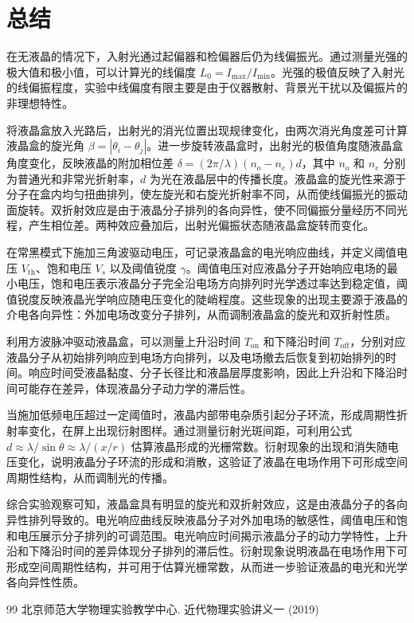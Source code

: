 \documentclass[a4paper, 1.5lines]{ctexart}
\begin{document}
    \section{总结}
        在无液晶的情况下，入射光通过起偏器和检偏器后仍为线偏振光。通过测量光强的极大值和极小值，可以计算光的线偏度 $L_0 = I_{\text{max}}/I_{\text{min}}$。光强的极值反映了入射光的线偏振程度，实验中线偏度有限主要是由于仪器散射、背景光干扰以及偏振片的非理想特性。

将液晶盒放入光路后，出射光的消光位置出现规律变化，由两次消光角度差可计算液晶盒的旋光角 $\beta = |\theta_i - \theta_j|$。进一步旋转液晶盒时，出射光的极值角度随液晶盒角度变化，反映液晶的附加相位差 $\delta = (2\pi/\lambda)(n_o - n_e)d$，其中 $n_o$ 和 $n_e$ 分别为普通光和非常光折射率，$d$ 为光在液晶层中的传播长度。液晶盒的旋光性来源于分子在盒内均匀扭曲排列，使左旋光和右旋光折射率不同，从而使线偏振光的振动面旋转。双折射效应是由于液晶分子排列的各向异性，使不同偏振分量经历不同光程，产生相位差。两种效应叠加后，出射光偏振状态随液晶盒旋转而变化。

在常黑模式下施加三角波驱动电压，可记录液晶盒的电光响应曲线，并定义阈值电压 $V_{\text{th}}$、饱和电压 $V_s$ 以及阈值锐度 $\gamma$。阈值电压对应液晶分子开始响应电场的最小电压，饱和电压表示液晶分子完全沿电场方向排列时光学透过率达到稳定值，阈值锐度反映液晶光学响应随电压变化的陡峭程度。这些现象的出现主要源于液晶的介电各向异性：外加电场改变分子排列，从而调制液晶盒的旋光和双折射性质。

利用方波脉冲驱动液晶盒，可以测量上升沿时间 $T_{\text{on}}$ 和下降沿时间 $T_{\text{off}}$，分别对应液晶分子从初始排列响应到电场方向排列，以及电场撤去后恢复到初始排列的时间。响应时间受液晶黏度、分子长径比和液晶层厚度影响，因此上升沿和下降沿时间可能存在差异，体现液晶分子动力学的滞后性。

当施加低频电压超过一定阈值时，液晶内部带电杂质引起分子环流，形成周期性折射率变化，在屏上出现衍射图样。通过测量衍射光斑间距，可利用公式 $d \approx \lambda/\sin\theta \approx \lambda/(x/r)$ 估算液晶形成的光栅常数。衍射现象的出现和消失随电压变化，说明液晶分子环流的形成和消散，这验证了液晶在电场作用下可形成空间周期性结构，从而调制光的传播。

综合实验观察可知，液晶盒具有明显的旋光和双折射效应，这是由液晶分子的各向异性排列导致的。电光响应曲线反映液晶分子对外加电场的敏感性，阈值电压和饱和电压展示分子排列的可调范围。电光响应时间揭示液晶分子的动力学特性，上升沿和下降沿时间的差异体现分子排列的滞后性。衍射现象说明液晶在电场作用下可形成空间周期性结构，并可用于估算光栅常数，从而进一步验证液晶的电光和光学各向异性性质。
\begin{thebibliography}{99}
        北京师范大学物理实验教学中心. 近代物理实验讲义一 (2019)
    \end{thebibliography}

    
\end{document}
